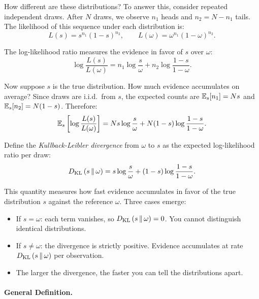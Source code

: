 How different are these distributions? To answer this, consider repeated independent draws. After $N$ draws, we observe $n_1$ heads and $n_2 = N - n_1$ tails. The likelihood of this sequence under each distribution is:
\begin{equation}
L(s) = s^{n_1} (1-s)^{n_2}, \qquad L(\omega) = \omega^{n_1} (1-\omega)^{n_2}.
\end{equation}

The log-likelihood ratio measures the evidence in favor of $s$ over $\omega$:
\begin{equation}
\log \frac{L(s)}{L(\omega)} = n_1 \log \frac{s}{\omega} + n_2 \log \frac{1-s}{1-\omega}.
\end{equation}

Now suppose $s$ is the true distribution. How much evidence accumulates on average? Since draws are i.i.d.\ from $s$, the expected counts are $\mathbb{E}_s[n_1] = Ns$ and $\mathbb{E}_s[n_2] = N(1-s)$. Therefore:
\begin{equation}
\mathbb{E}_s\left[\log \frac{L(s)}{L(\omega)}\right] = Ns \log \frac{s}{\omega} + N(1-s) \log \frac{1-s}{1-\omega}.
\end{equation}

Define the \emph{Kullback-Leibler divergence} from $\omega$ to $s$ as the expected log-likelihood ratio per draw:
\begin{equation}
\label{eq:kl-two-good}
D_{\mathrm{KL}}\left(s \,\|\, \omega\right) = s \log \frac{s}{\omega} + (1-s) \log \frac{1-s}{1-\omega}.
\end{equation}

This quantity measures how fast evidence accumulates in favor of the true distribution $s$ against the reference $\omega$. Three cases emerge:
\begin{itemize}[nosep]
    \item If $s = \omega$: each term vanishes, so $D_{\mathrm{KL}}\left(s \,\|\, \omega\right) = 0$. You cannot distinguish identical distributions.
    \item If $s \neq \omega$: the divergence is strictly positive. Evidence accumulates at rate $D_{\mathrm{KL}}\left(s \,\|\, \omega\right)$ per observation.
    \item The larger the divergence, the faster you can tell the distributions apart.
\end{itemize}

\paragraph{General Definition.}

